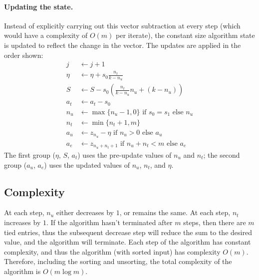 \documentclass[12pt]{article}
\begin{document}
\paragraph{Updating the state.}
Instead of explicitly carrying out this
vector subtraction at every step (which would have a complexity of $O(m)$ per
iterate), the constant size algorithm state is updated to reflect the change
in the vector. The updates are applied in the order shown:
\[
\begin{array}{ll}
    j &\leftarrow j+1\\
    \eta &\leftarrow \eta + s_0\frac{n_t}{k-n_u}\\
    S &\leftarrow S - s_0\left(\frac{n_t}{k-n_u}n_u + (k-n_u)\right)\\
    a_t &\leftarrow a_t - s_0\\
    n_u &\leftarrow \max\{n_u - 1, 0\} \text{~if~} s_0=s_1 \text{~else~}n_u\\
    n_t &\leftarrow \min\{n_t+1,m\}\\
    a_u &\leftarrow z_{n_u} - \eta \text{~if~} n_u > 0 \text{~else~} a_u\\
    a_e &\leftarrow z_{n_u+n_t+1} \text{~if~} n_u+n_t < m \text{~else~} a_e
\end{array}
\]
The first group ($\eta$, $S$, $a_t$) uses the pre-update values
of $n_u$ and $n_t$; the second group ($a_u$, $a_e$) uses the
updated values of $n_u$, $n_t$, and $\eta$.

\subsection{Complexity}
At each step, $n_u$ either decreases by $1$, or remains the same. At each step,
$n_t$ increases by $1$. If the algorithm hasn't terminated after $m$ steps, then
there are $m$ tied entries, thus the subsequent decrease step will reduce the sum
to the desired value, and the algorithm will terminate. Each step of the
algorithm has constant complexity, and thus the algorithm (with sorted input)
has complexity $O(m)$. Therefore, including the sorting and unsorting, the total
complexity of the algorithm is $O(m\log m)$.
\end{document}
